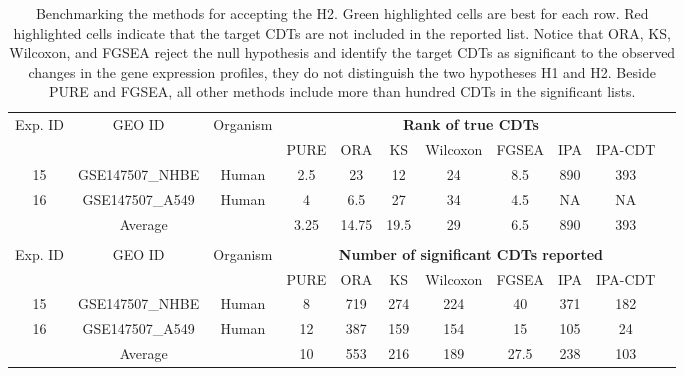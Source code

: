 \documentclass[Minh_PhD_thesis.tex]{subfiles}
\begin{document}
\begin{table}
\caption{\label{H2Result} Benchmarking the methods for accepting the H2. Green highlighted cells are best for each row. Red highlighted cells indicate that the target CDTs are not included in the reported list. Notice that ORA, KS, Wilcoxon, and FGSEA reject the null hypothesis and identify the target CDTs as significant to the observed changes in the gene expression profiles, they do not distinguish the two hypotheses H1 and H2. Beside PURE and FGSEA, all other methods include more than hundred CDTs in the significant lists.}
\begin{center}
\scriptsize
\begin{tabular}{ ccc|cccccccc } 

 \hline \hline

\multirow{2}{*}{Exp. ID}& \multirow{2}{*}{GEO ID}& \multirow{2}{*}{Organism}& \multicolumn{7}{c}{\textbf{Rank of true CDTs}} \\
& & &   PURE  & ORA & KS  & Wilcoxon & FGSEA & IPA & IPA-CDT\\
\hline
15	& GSE147507\_NHBE	& Human	&	\cellcolor{green}2.5	&	23	&	12	&	24	&	8.5	&	\cellcolor{red}890 &\cellcolor{red} 393\\
16	& GSE147507\_A549	& Human 	&	\cellcolor{green}4	&	6.5	&	27	&	34	&	4.5	& \cellcolor{red}NA & \cellcolor{red}NA\\
\hline
\multicolumn{3}{c}{Average}	& 	\cellcolor{green}3.25 	&	14.75	 & 	19.5 	& 	29 	& 	6.5 	& 	890 	&	393 \\ 
\hline 
 \multicolumn{10}{c}{}\\
\hline


\multirow{2}{*}{Exp. ID}& \multirow{2}{*}{GEO ID}& \multirow{2}{*}{Organism}& \multicolumn{7}{c}{\textbf{Number of significant CDTs reported}} \\
& & &   PURE  & ORA & KS  & Wilcoxon & FGSEA & IPA & IPA-CDT\\

\hline
15	& GSE147507\_NHBE	& Human	&	\cellcolor{green}8	&	719	&	274	&	224	&	40	&	\cellcolor{red}371& 	\cellcolor{red}182\\
16	& GSE147507\_A549	& Human 	&	\cellcolor{green}12	&	387	&	159	&	154	& 	15 	& 	\cellcolor{red}105&		\cellcolor{red}24\\
\hline
\multicolumn{3}{c}{Average}& \cellcolor{green}10 &	553 	&	216 	& 189 	& 	27.5 & 238 & 103 \\ 
\hline \hline
 
\end{tabular}
\end{center}
\end{table}
\end{document}
